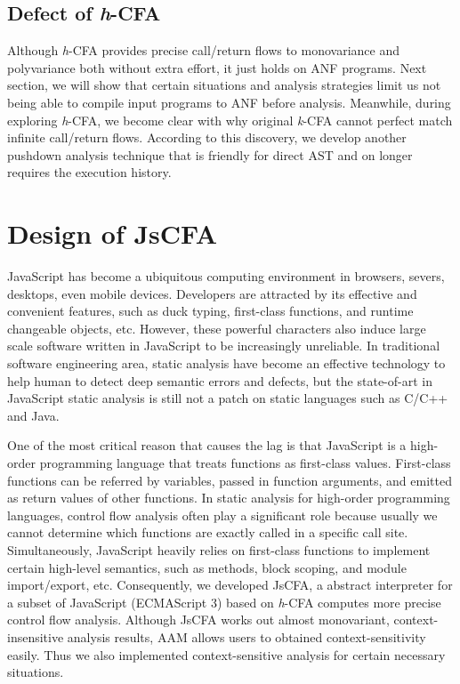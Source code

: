 \documentclass{article}
\begin{document}
\subsection{Defect of \textit{h}-CFA}
\label{sub:Defect of h-CFA}
Although \textit{h}-CFA provides precise call/return flows to monovariance and polyvariance both without extra effort, it just holds on ANF programs. Next section, we will show that certain situations and analysis strategies limit us not being able to compile input programs to ANF before analysis.
Meanwhile, during exploring \textit{h}-CFA, we become clear with why original \textit{k}-CFA cannot perfect match infinite call/return flows. According to this discovery, we develop another pushdown analysis technique that is friendly for direct AST and on longer requires the execution history.

\section{Design of JsCFA}
\label{sec:JsCFA}
JavaScript has become a ubiquitous computing environment in browsers, severs, desktops, even mobile devices. Developers are attracted by its effective and convenient features, such as duck typing, first-class functions, and runtime changeable objects, etc. However, these powerful characters also induce large scale software written in JavaScript to be increasingly unreliable.
In traditional software engineering area, static analysis have become an effective technology to help human to detect deep semantic errors and defects, but the state-of-art in JavaScript static analysis is still not a patch on static languages such as C/C++ and Java.

One of the most critical reason that causes the lag is that JavaScript is a high-order programming language that treats functions as first-class values. First-class functions can be referred by variables, passed in function arguments, and emitted as return values of other  functions.
In static analysis for high-order programming languages, control flow analysis often play a significant role because usually we cannot determine which functions are exactly called in a specific call site.
Simultaneously, JavaScript heavily relies on first-class functions to implement certain high-level semantics, such as methods, block scoping, and module import/export, etc.
Consequently, we developed JsCFA, a abstract interpreter for a subset of JavaScript (ECMAScript 3) based on \textit{h}-CFA computes more precise control flow analysis.
Although JsCFA works out almost monovariant, context-insensitive analysis results, AAM allows users to obtained context-sensitivity easily.
Thus we also implemented context-sensitive analysis for certain necessary situations.
\end{document}
